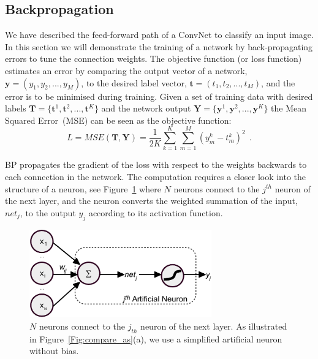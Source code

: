 \subsection{Backpropagation}
We have described the feed-forward path of a ConvNet to classify an input image.
In this section we will demonstrate the training of a network by back-propagating errors to tune the connection weights.
The objective function (or loss function) estimates an error by comparing the output vector of a network, $\mathbf{y}=(y_1,y_2,...,y_M)$, to the desired label vector, $\mathbf{t}=(t_1,t_2,...,t_M)$, and the error is to be minimised during training.
Given a set of training data with desired labels $\mathbf{T}=\{\mathbf{t}^1, \mathbf{t}^2, ..., \mathbf{t}^K\}$ and the network output $\mathbf{Y}=\{\mathbf{y}^1, \mathbf{y}^2, ..., \mathbf{y}^K\}$ the Mean Squared Error~(MSE) can be seen as the objective function:  
\begin{equation}
L={MSE}(\mathbf{T}, \mathbf{Y}) =\frac{1}{2K}\sum_{k=1}^K \sum_{m=1}^M (y^{k}_{m}-t^{k}_{m})^{2}~~.
\label{equ:loss_all}
\end{equation}

BP propagates the gradient of the loss with respect to the weights backwards to each connection in the network.
The computation requires a closer look into the structure of a neuron, see Figure~\ref{Fig:neuron_net} where $N$ neurons connect to the $j^{th}$ neuron of the next layer, and the neuron converts the weighted summation of the input, $net_j$, to the output $y_j$ according to its activation function.
\begin{figure}[bt]
	\centering
	\includegraphics[width=0.7\textwidth]{pics_iconip/neuron.pdf}
	\caption[An artificial neuron.]{$N$ neurons connect to the $j_{th}$ neuron of the next layer. As illustrated in Figure~\ref{Fig:compare_as}(a), we use a simplified artificial neuron without bias.}
	\label{Fig:neuron_net}
\end{figure}


